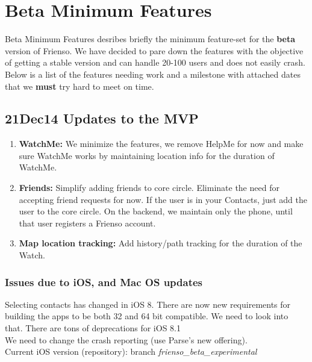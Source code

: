 \chapter{Beta Minimum Features}

\begin{introduction}
  Beta Minimum Features desribes briefly the minimum feature-set for the \textbf{beta} version
  of Frienso.  We have decided to pare down the features with the objective of getting a 
  stable version and can handle 20-100 users and does not easily crash. Below is a list of
  the features needing work and a milestone with attached dates that we \textbf{must} try hard
  to meet on time. 
\end{introduction}

\section{21Dec14 Updates to the MVP}

\begin{enumerate}
\item \textbf{WatchMe:}  We minimize the features, we remove HelpMe for now and make sure WatchMe works by maintaining location info for the duration of WatchMe.
\item \textbf{Friends:} Simplify adding friends to core circle. Eliminate the need for accepting friend requests for now. If the user is in your Contacts, just add the user to the core circle.  On the backend, we maintain only the phone, until that user registers a Frienso account.
\item \textbf{Map location tracking:} Add history/path tracking for the duration of the Watch.
\end{enumerate}

\subsection{Issues due to iOS, and Mac OS updates}
Selecting contacts has changed in iOS 8.  There are now new requirements for building the apps to be both 32 and 64 bit compatible. We need to look into that. There are tons of deprecations for iOS 8.1\\

We need to change the crash reporting (use Parse's new offering). \\

Current iOS version (repository): branch \emph{ frienso\_beta\_experimental} \\

